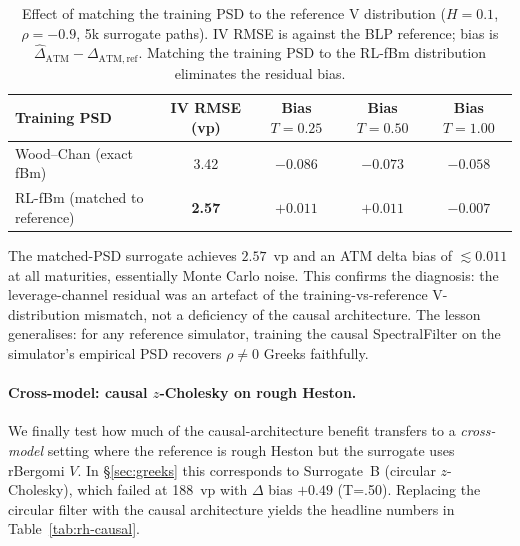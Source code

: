 \documentclass[11pt,a4paper]{article}
\begin{document}
\begin{table}[h]
\centering
\caption{Effect of matching the training PSD to the reference V
distribution ($H=0.1$, $\rho=-0.9$, 5k surrogate paths). IV RMSE is
against the BLP reference; bias is
$\hat\Delta_{\mathrm{ATM}} - \Delta_{\mathrm{ATM,ref}}$. Matching the
training PSD to the RL-fBm distribution eliminates the residual bias.}
\label{tab:rl-match}
\begin{tabular}{lcccc}
\toprule
Training PSD & IV RMSE (vp) & Bias $T=0.25$ & Bias $T=0.50$ & Bias $T=1.00$ \\
\midrule
Wood--Chan (exact fBm)     & 3.42 & $-0.086$ & $-0.073$ & $-0.058$ \\
RL-fBm (matched to reference) & \textbf{2.57} & \textbf{$+0.011$} & \textbf{$+0.011$} & \textbf{$-0.007$} \\
\bottomrule
\end{tabular}
\end{table}

The matched-PSD surrogate achieves $2.57$~vp and an ATM delta bias of
$\lesssim 0.011$ at all maturities, essentially Monte Carlo noise.
This confirms the diagnosis: the leverage-channel residual was an
artefact of the training-vs-reference V-distribution mismatch, not a
deficiency of the causal architecture. The lesson generalises: for
any reference simulator, training the causal SpectralFilter on the
simulator's empirical PSD recovers $\rho \neq 0$ Greeks faithfully.

\paragraph{Cross-model: causal $z$-Cholesky on rough Heston.}
We finally test how much of the causal-architecture benefit transfers
to a \emph{cross-model} setting where the reference is rough Heston but
the surrogate uses rBergomi $V$. In §\ref{sec:greeks} this corresponds
to Surrogate~B (circular $z$-Cholesky), which failed at 188~vp with
$\Delta$ bias $+0.49$ (T=.50). Replacing the circular filter with the
causal architecture yields the headline numbers in Table~\ref{tab:rh-causal}.
\end{document}
